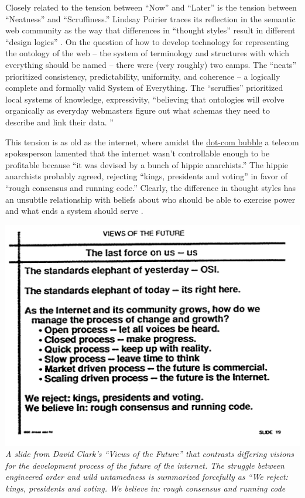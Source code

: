 \documentclass[notoc]{tufte-book}
\begin{document}
Closely related to the tension between ``Now'' and ``Later'' is the
tension between ``Neatness'' and ``Scruffiness.'' Lindsay Poirier traces
its reflection in the semantic web community as the way that differences
in ``thought styles'' result in different ``design logics'' \citep{poirierTurnScruffyEthnographic2017} . On the question of how to
develop technology for representing the ontology of the web -- the
system of terminology and structures with which everything should be
named -- there were (very roughly) two camps. The ``neats'' prioritized
consistency, predictability, uniformity, and coherence -- a logically
complete and formally valid System of Everything. The ``scruffies''
prioritized local systems of knowledge, expressivity, ``believing that
ontologies will evolve organically as everyday webmasters figure out
what schemas they need to describe and link their data. \citep{poirierTurnScruffyEthnographic2017} ''

This tension is as old as the internet, where amidst the
\href{https://en.wikipedia.org/wiki/Dot-com_bubble}{dot-com bubble} a
telecom spokesperson lamented that the internet wasn't controllable
enough to be profitable because ``it was devised by a bunch of hippie
anarchists.'' \citep{hiltzikTamingWildWild2001}  The hippie
anarchists probably agreed, rejecting ``kings, presidents and voting''
in favor of ``rough consensus and running code.'' Clearly, the
difference in thought styles has an unsubtle relationship with beliefs
about who should be able to exercise power and what ends a system should
serve \citep{larsenPoliticalNatureTCP2012} .

\includegraphics[width=\linewidth]{../assets/images/clark-slide.png} \emph{A
slide from David Clark's ``Views of the Future''\citep{clarkCloudyCrystalBall1992}  that contrasts differing visions for the
development process of the future of the internet. The struggle between
engineered order and wild untamedness is summarized forcefully as ``We
reject: kings, presidents and voting. We believe in: rough consensus and
running code}
\end{document}
